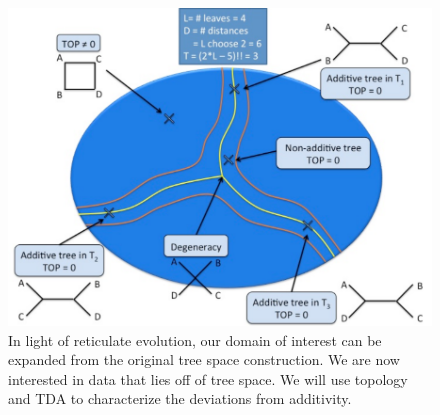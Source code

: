 \begin{figure}
\centering
\includegraphics[]{./fig/background/tree_space_revisited.pdf}
\caption[Tree Space Revisited]{In light of reticulate evolution, our domain of interest can be expanded from the original tree space construction. We are now interested in data that lies off of tree space. We will use topology and TDA to characterize the deviations from additivity.}
\label{fig:bg:tree_space_revisited}
\end{figure}